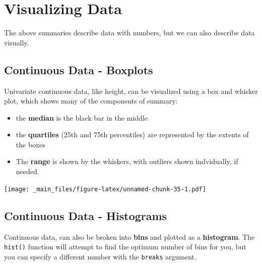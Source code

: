 \documentclass[
]{book}
\newenvironment{Shaded}{\begin{snugshade}}{\end{snugshade}}
\newcommand{\AttributeTok}[1]{\textcolor[rgb]{0.13,0.29,0.53}{#1}}
\newcommand{\FunctionTok}[1]{\textcolor[rgb]{0.13,0.29,0.53}{\textbf{#1}}}
\newcommand{\NormalTok}[1]{#1}
\newcommand{\SpecialCharTok}[1]{\textcolor[rgb]{0.81,0.36,0.00}{\textbf{#1}}}
\newcommand{\StringTok}[1]{\textcolor[rgb]{0.31,0.60,0.02}{#1}}
\providecommand{\tightlist}{%
  \setlength{\itemsep}{0pt}\setlength{\parskip}{0pt}}
\begin{document}
\hypertarget{visualizing-data-1}{%
\section{Visualizing Data}\label{visualizing-data-1}}

The above summaries describe data with numbers, but we can also describe data visually.

\hypertarget{continuous-data---boxplots}{%
\subsection{Continuous Data - Boxplots}\label{continuous-data---boxplots}}

Univariate continuous data, like height, can be visualized using a box and whisker plot, which shows many of the components of summary:

\begin{itemize}
\tightlist
\item
  the \textbf{median} is the black bar in the middle
\item
  the \textbf{quartiles} (25th and 75th percentiles) are represented by the extents of the boxes
\item
  The \textbf{range} is shown by the whiskers, with outliers shown indvidually, if needed.
\end{itemize}

\begin{Shaded}
\end{Shaded}

\texttt{[image: \_main\_files/figure-latex/unnamed-chunk-35-1.pdf]}

\hypertarget{continuous-data---histograms}{%
\subsection{Continuous Data - Histograms}\label{continuous-data---histograms}}

Continuous data, can also be broken into \textbf{bins} and plotted as a \textbf{histogram}. The \texttt{hist()} function will attempt to find the optimum number of bins for you, but you can specify a different number with the \texttt{breaks} argument.

\begin{Shaded}
\end{Shaded}
\end{document}
